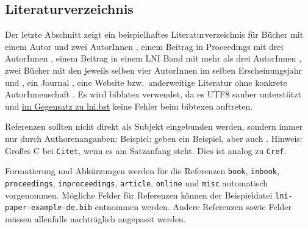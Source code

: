 \documentclass[utf8,biblatex]{lni}
\begin{document}
\subsection{Literaturverzeichnis}
Der letzte Abschnitt zeigt ein beispielhaftes Literaturverzeichnis für Bücher mit einem Autor \cite{Ez10} und zwei AutorInnen \cite{AB00}, einem Beitrag in Proceedings mit drei AutorInnen \cite{ABC01}, einem Beitrag in einem LNI Band mit mehr als drei AutorInnen \cite{Az09}, zwei Bücher mit den jeweils selben vier AutorInnen im selben Erscheinungsjahr \cite{Wa14} und \cite{Wa14b}, ein Journal \cite{Gl06}, eine Website \cite{GI14} bzw.\ anderweitige Literatur ohne konkrete AutorInnenschaft \cite{XX14}.
Es wird biblatex verwendet, da es UTF8 sauber unterstützt und \href{https://github.com/gi-ev/LNI/issues/5}{im Gegensatz zu lni.bst} keine Fehler beim bibtexen auftreten.

Referenzen sollten nicht direkt als Subjekt eingebunden werden, sondern immer nur durch Authorenanganben:
Beispiel:  geben ein Beispiel, aber auch \citet{Az09}.
Hinweis: Großes C bei \texttt{Citet}, wenn es am Satzanfang steht. Dies ist analog zu \texttt{Cref}.

Formatierung und Abkürzungen werden für die Referenzen \texttt{book}, \texttt{inbook}, \texttt{proceedings}, \texttt{inproceedings}, \texttt{article}, \texttt{online} und \texttt{misc} automatisch vorgenommen.
Mögliche Felder für Referenzen können der Beispieldatei \texttt{lni-paper-example-de.bib} entnommen werden.
Andere Referenzen sowie Felder müssen allenfalls nachträglich angepasst werden.
\end{document}
